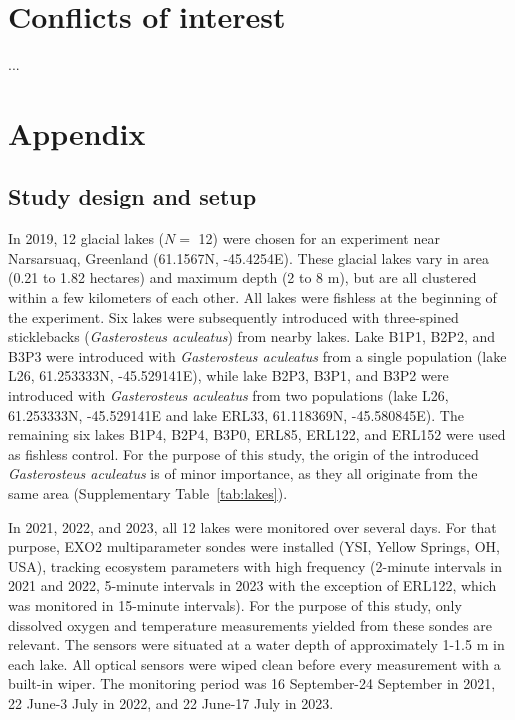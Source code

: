 \documentclass[fleqn,11pt,lineno]{manuscript}\usepackage[]{graphicx}\usepackage[]{xcolor}
\newcommand{\beginsupplement}{%
        \setcounter{table}{0}
        \renewcommand{\thetable}{S\arabic{table}}%
        \setcounter{figure}{0}
        \renewcommand{\thefigure}{S\arabic{figure}}%
     }
\begin{document}
\section*{Conflicts of interest}
...





\clearpage

\beginsupplement
\renewcommand\figurename{Supplementary Figure}
\renewcommand\tablename{Supplementary Table}

\section*{Appendix}

\subsection{Study design and setup} \label{subsec:design}

In 2019, 12 glacial lakes ($N =$ 12) were chosen for an experiment near Narsarsuaq,
Greenland (61.1567\textdegree{}N, -45.4254\textdegree{}E).
These glacial lakes vary in area (0.21 to 1.82 hectares) and maximum
depth (2 to 8 m), but are all clustered within a few
kilometers of each other. All lakes were fishless at the beginning of the experiment.
Six lakes were subsequently introduced with three-spined sticklebacks
(\textit{Gasterosteus aculeatus}) from nearby lakes.
Lake B1P1, B2P2, and B3P3 were introduced with \textit{Gasterosteus aculeatus} from a single
population (lake L26, 61.253333\textdegree{}N, -45.529141\textdegree{}E),
while lake B2P3, B3P1, and B3P2 were introduced with \textit{Gasterosteus aculeatus} from
two populations (lake L26, 61.253333\textdegree{}N, -45.529141\textdegree{}E
and lake ERL33, 61.118369\textdegree{}N, -45.580845\textdegree{}E).
The remaining six lakes B1P4, B2P4, B3P0, ERL85, ERL122, and ERL152 were
used as fishless control. For the purpose of this study, the origin
of the introduced \textit{Gasterosteus aculeatus} is of minor importance,
as they all originate from the same area (Supplementary Table~\ref{tab:lakes}).

In 2021, 2022, and 2023, all 12 lakes were monitored over several days.
For that purpose, EXO2 multiparameter sondes were installed
(YSI, Yellow Springs, OH, USA), tracking ecosystem parameters with high
frequency (2-minute intervals in 2021 and 2022, 5-minute intervals in
2023 with the exception of ERL122, which was monitored in 15-minute intervals).
For the purpose of this study, only dissolved oxygen and temperature measurements
yielded from these sondes are relevant. The sensors were situated at a water depth
of approximately 1-1.5 m in each lake. All optical sensors were
wiped clean before every measurement with a built-in wiper.
The monitoring period was 16 September-24 September in 2021, 22 June-3 July in 2022,
and 22 June-17 July in 2023.
\end{document}
